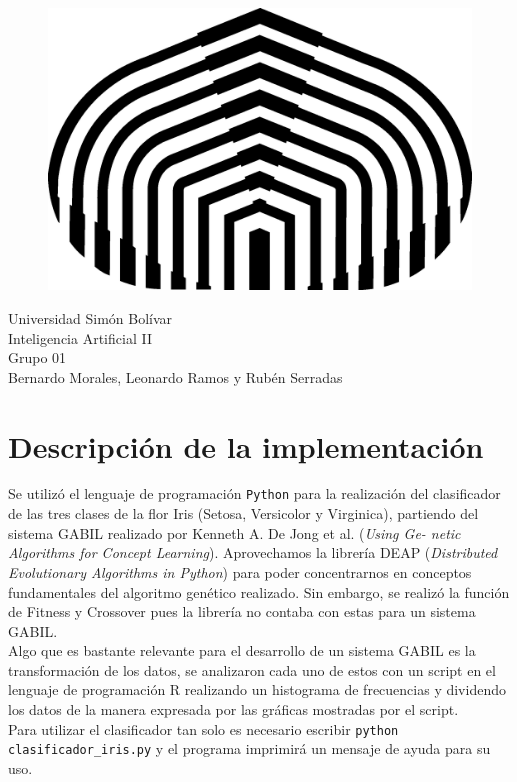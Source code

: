 \documentclass[a4paper,10pt]{article}
\begin{document}
\begin{flushleft}
\begin{figure}
 \includegraphics[scale=0.4]{logo}
\end{figure}
 Universidad Simón Bolívar\\
 Inteligencia Artificial II\\
 Grupo 01 \\
 Bernardo Morales, Leonardo Ramos y Rubén Serradas\\
\end{flushleft}

\begin{abstract}

\end{abstract}

\section{Descripción de la implementación}

\indent Se utilizó el lenguaje de programación \verb|Python| para la realización del 
clasificador de las tres clases de la flor Iris (Setosa, Versicolor y Virginica), 
partiendo del sistema GABIL realizado por Kenneth A. De Jong et al. (\emph{Using Ge-
netic Algorithms for Concept Learning}). Aprovechamos la librería DEAP (\emph{Distributed Evolutionary Algorithms in Python})
para poder concentrarnos en conceptos fundamentales del algoritmo genético realizado. Sin embargo, se realizó
la función de Fitness y Crossover pues la librería no contaba con estas para un sistema GABIL.\\
\indent Algo que es bastante relevante para el desarrollo de un sistema GABIL es la transformación de 
los datos, se analizaron cada uno de estos con un script en el lenguaje de programación R
realizando un histograma de frecuencias y dividendo los datos de la manera expresada
por las gráficas mostradas por el script.\\
\indent Para utilizar el clasificador tan solo es necesario escribir \verb|python clasificador_iris.py| y 
el programa imprimirá un mensaje de ayuda para su uso.
\end{document}

